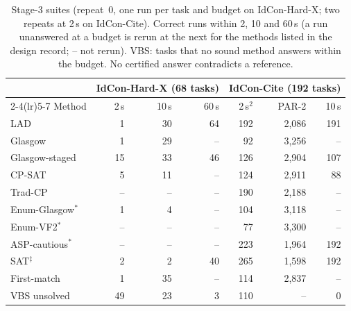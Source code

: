 \begin{table}[t]
\caption{Stage-3 suites (repeat~0, one run per task and budget on IdCon-Hard-X; two repeats at 2\,s on IdCon-Cite). Correct runs within 2, 10 and 60\,s (a run unanswered at a budget is rerun at the next for the methods listed in the design record; -- not rerun). VBS: tasks that no sound method answers within the budget. No certified answer contradicts a reference.}
\label{tab:newsuites}
\centering\footnotesize
\setlength{\tabcolsep}{2.6pt}
\begin{tabular}{lrrr rrr}
\toprule
 & \multicolumn{3}{c}{IdCon-Hard-X (68 tasks)} & \multicolumn{3}{c}{IdCon-Cite (192 tasks)}\\
\cmidrule(lr){2-4}\cmidrule(lr){5-7}
Method & 2\,s & 10\,s & 60\,s & 2\,s$^{2}$ & PAR-2 & 10\,s\\
\midrule
LAD & 1 & 30 & 64 & 192 & 2,086 & 191\\
Glasgow & 1 & 29 & -- & 92 & 3,256 & --\\
Glasgow-staged & 15 & 33 & 46 & 126 & 2,904 & 107\\
CP-SAT & 5 & 11 & -- & 124 & 2,911 & 88\\
Trad-CP & -- & -- & -- & 190 & 2,188 & --\\
Enum-Glasgow$^\ast$ & 1 & 4 & -- & 104 & 3,118 & --\\
Enum-VF2$^\ast$ & -- & -- & -- & 77 & 3,300 & --\\
ASP-cautious$^\ast$ & -- & -- & -- & 223 & 1,964 & 192\\
SAT$^\ddagger$ & 2 & 2 & 40 & 265 & 1,598 & 192\\
\midrule
First-match & 1 & 35 & -- & 114 & 2,837 & --\\
\midrule
VBS unsolved & 49 & 23 & 3 & 110 & -- & 0\\
\bottomrule
\end{tabular}
\end{table}
